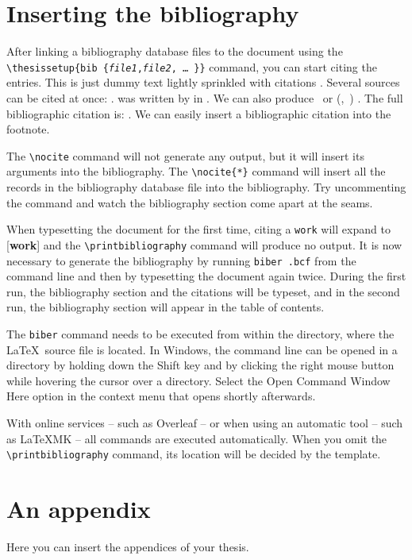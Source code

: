 \documentclass[
  digital,     %
  oneside,     %
  nosansbold,  %
  nocolorbold, %
  lof,         %
  lot,         %
]{fithesis4}
\begin{document}
\chapter{Inserting the bibliography}
After linking a bibliography data\-base files to the document using
the \verb"\"\texttt{thesis\discretionary{-}{}{}setup\{bib\discretionary{=}{=}{=}%
\{\textit{file1},\textit{file2},\,\ldots\,\}\}} command, you can
start citing the entries. This is just dummy text
\parencite{borgman03} lightly sprinkled with citations
\parencite[p.~123]{greenberg98}. Several sources can be cited at
once: \cite{borgman03,greenberg98,thanh01}.
 was written by \citeauthor{greenberg98} in
\citeyear{greenberg98}. We can also produce \textcite{greenberg98}%
\ or %
\def\citeauthoryear#1{(\textcite{#1},~\citeyear{#1})}%
\citeauthoryear{greenberg98}%
. The full bibliographic citation is:
\emph{}. We can easily insert a bibliographic
citation into the footnote.

The \verb"\nocite" command will not generate any
output\nocite{muni}, but it will insert its arguments into
the bibliography. The \verb"\nocite{*}" command will insert all the
records in the bibliography database file into the bibliography.
Try uncommenting the command
and watch the bibliography section come apart at the seams.

When typesetting the document for the first time, citing a
\texttt{work} will expand to [\textbf{work}] and the
\verb"\printbibliography" command will produce no output. It is now
necessary to generate the bibliography by running \texttt{biber
\jobname.bcf} from the command line and then by typesetting the
document again twice. During the first run, the bibliography
section and the citations will be typeset, and in the second run,
the bibliography section will appear in the table of contents.

The \texttt{biber} command needs to be executed from within the
directory, where the \LaTeX\ source file is located. In Windows,
the command line can be opened in a directory by holding down the
\textsf{Shift} key and by clicking the right mouse button while
hovering the cursor over a directory.  Select the \textsf{Open
Command Window Here} option in the context menu that opens shortly
afterwards.

With online services -- such as Overleaf -- or when using an
automatic tool -- such as \LaTeX MK -- all commands are executed
automatically. When you omit the \verb"\printbibliography" command,
its location will be decided by the template.

  \printbibliography[heading=bibintoc] %


\appendix %
\chapter{An appendix}
Here you can insert the appendices of your thesis.
\end{document}
